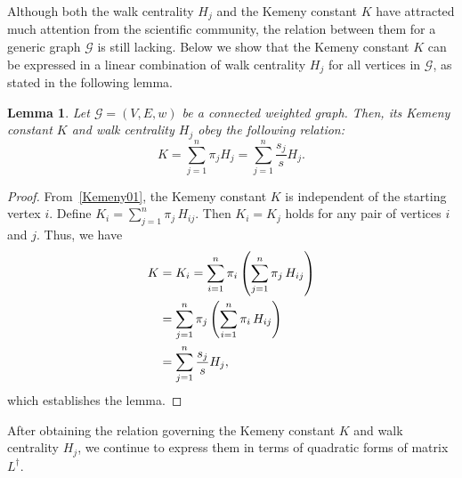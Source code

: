 \documentclass[sigconf]{acmart}
\newtheorem{lemma}[theorem]{Lemma}
\def\calG{\mathcal{G}}
\newcommand\LL{\boldsymbol{\mathit{L}}}
\begin{document}
Although both the walk centrality $H_j$ and the Kemeny constant $K$ have attracted much attention from the scientific community, the relation between  them for a generic  graph  $\calG$ is still lacking. Below we show that the Kemeny constant $K$ can be expressed in a linear combination of walk centrality  $H_j$ for all vertices in $\calG$, as stated in the following lemma.

\begin{lemma}
	Let $\calG=(V,E,w)$ be a connected weighted graph. Then, its  Kemeny constant $K$  and walk centrality $H_j$ obey the following relation:
	\begin{equation}\label{HjK01}
		K=\sum_{j=1}^{n} \pi_j H_j=\sum_{j=1}^{n} \frac{s_j}{s} H_j.
	\end{equation}
\end{lemma}
\begin{proof}
	From~\eqref{Kemeny01}, the Kemeny constant $K$ is independent of the starting vertex $i$. Define $K_i =\sum_{j=1}^{n}\pi_j\,H_{ij}$. Then   $K_i=K_j$ holds for any pair of vertices $i$ and $j$. Thus, we have
	\begin{align}\label{Kemeny02}
		K & =K_i =\sum_{i=1}^{n} \pi_i \left( \sum_{j=1}^{n}\pi_j\,H_{ij}\right) \notag \\
		  & =\sum_{j=1}^{n} \pi_j \left( \sum_{i=1}^{n}\pi_i\,H_{ij}\right) \notag      \\
		  & =\sum_{j=1}^{n} \frac{s_j}{s} H_j,\notag
	\end{align}
	which establishes the lemma.
\end{proof}

After obtaining the relation governing  the Kemeny constant $K$  and walk centrality $H_j$, we continue to express them in terms of quadratic forms of matrix  $\LL^{\dagger}$.
\end{document}
